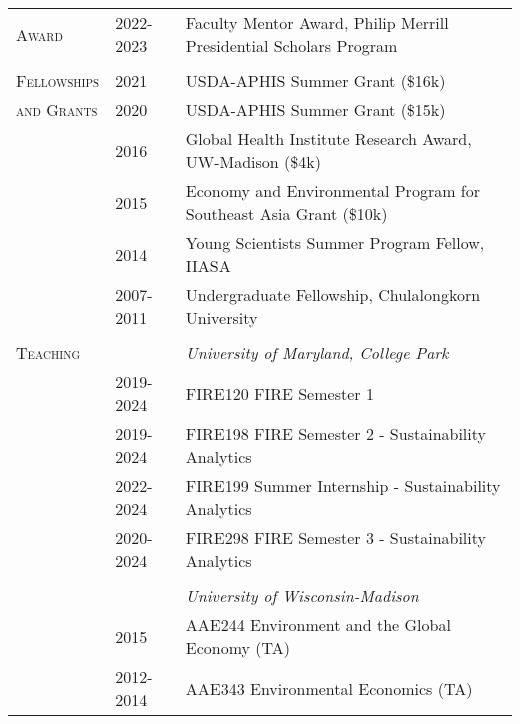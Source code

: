 \documentclass[letterpaper,11pt,oneside]{article}\usepackage[]{graphicx}\usepackage[]{xcolor}
\begin{document}
\noindent \begin{tabular}{p{1.2in} p{0.9in} l}     
\textsc{Award} & 2022-2023 & Faculty Mentor Award, Philip Merrill Presidential Scholars Program \\	
               & & \\
\textsc{Fellowships}	& 2021				& USDA-APHIS Summer Grant (\$16k) \\
\textsc{and Grants }	& 2020				& USDA-APHIS Summer Grant (\$15k) \\
                    	& 2016				& Global Health Institute Research Award, UW-Madison (\$4k) \\
                    	& 2015				& Economy and Environmental Program for Southeast Asia Grant (\$10k) \\
                    	& 2014				& Young Scientists Summer Program Fellow, IIASA \\
                    	& 2007-2011		& Undergraduate Fellowship, Chulalongkorn University \\
                    	& & \\
                    	
\textsc{Teaching}     & & \textit{University of Maryland, College Park} \\
                      & 2019-2024     & FIRE120 FIRE Semester 1 \\
		                  & 2019-2024     & FIRE198 FIRE Semester 2 - Sustainability Analytics \href{https://github.com/ruangmas/ruangmas.github.io/blob/main/documents/FIRE198.pdf}{\color{blue}{[SYLLABUS]}}\\
                      & 2022-2024     & FIRE199 Summer Internship - Sustainability Analytics \href{https://github.com/ruangmas/ruangmas.github.io/blob/main/documents/FIRE199.pdf}{\color{blue}{[SYLLABUS]}}\\
				              & 2020-2024	    & FIRE298 FIRE Semester 3 - Sustainability Analytics \href{https://github.com/ruangmas/ruangmas.github.io/blob/main/documents/FIRE298.pdf}{\color{blue}{[SYLLABUS]}}\\ 
				              & & \\
                      &               & \textit{University of Wisconsin-Madison} \\
				              & 2015          & AAE244 Environment and the Global Economy (TA) \\
				              & 2012-2014     & AAE343 Environmental Economics (TA)\\				              
\end{tabular}
                    	
\end{document}
